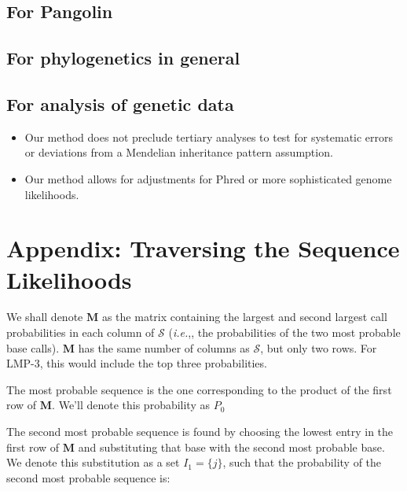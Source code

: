 \documentclass[
]{article}
\providecommand{\tightlist}{%
  \setlength{\itemsep}{0pt}\setlength{\parskip}{0pt}}
\newcommand{\ie}{\textit{i.e.},\xspace}
\newcommand{\nps}{\mathcal{S}} %
\begin{document}
\hypertarget{for-pangolin}{%
\subsection{For Pangolin}\label{for-pangolin}}

\hypertarget{for-phylogenetics-in-general}{%
\subsection{For phylogenetics in
general}\label{for-phylogenetics-in-general}}

\hypertarget{for-analysis-of-genetic-data}{%
\subsection{For analysis of genetic
data}\label{for-analysis-of-genetic-data}}

\begin{itemize}
\tightlist
\item
  Our method does not preclude tertiary analyses to test for systematic
  errors or deviations from a Mendelian inheritance pattern assumption.
\item
  Our method allows for adjustments for Phred or more sophisticated
  genome likelihoods.
\end{itemize}

\clearpage

\hypertarget{appendix-traversing-the-sequence-likelihoods}{%
\section{Appendix: Traversing the Sequence
Likelihoods}\label{appendix-traversing-the-sequence-likelihoods}}

We shall denote \(\mathbf M\) as the matrix containing the largest and
second largest call probabilities in each column of \(\nps\) (\ie, the
probabilities of the two most probable base calls). \(\mathbf M\) has
the same number of columns as \(\nps\), but only two rows. For LMP-3,
this would include the top three probabilities.

The most probable sequence is the one corresponding to the product of
the first row of \(\mathbf M\). We'll denote this probability as \(P_0\)

The second most probable sequence is found by choosing the lowest entry
in the first row of \(\mathbf M\) and substituting that base with the
second most probable base. We denote this substitution as a set
\(I_1=\{j\}\), such that the probability of the second most probable
sequence is:
\end{document}
